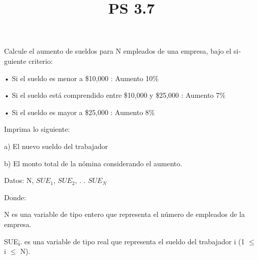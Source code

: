 \documentclass[11pt]{amsart}
\title{PS 3.7}
\begin{document}
\maketitle
\noindent Calcule el aumento de sueldos para N empleados de una empresa, bajo el si­guiente criterio:
\newline

• Si el sueldo es menor a \$10,000 :  Aumento 10\%

• Si el sueldo está comprendido entre \$10,000 y \$25,000 :  Aumento 7\% 

• Si el sueldo es mayor a \$25,000 : Aumento 8\%
\newline

\noindent Imprima lo siguiente:
\newline

a) El nuevo sueldo del trabajador

b) El monto total de la nómina considerando el aumento.
\newline

\noindent Datos: N, $SUE_{1}$, $SUE_{2}$, . . $SUE_{N}$
\newline

\noindent Donde:
\newline

N es una variable de tipo entero que representa el número de em­pleados de la empresa.
\newline

SUE¡. es una variable de tipo real que representa el sueldo del trabajador i (1 $\leq$ i $\leq$ N).
\end{document}
